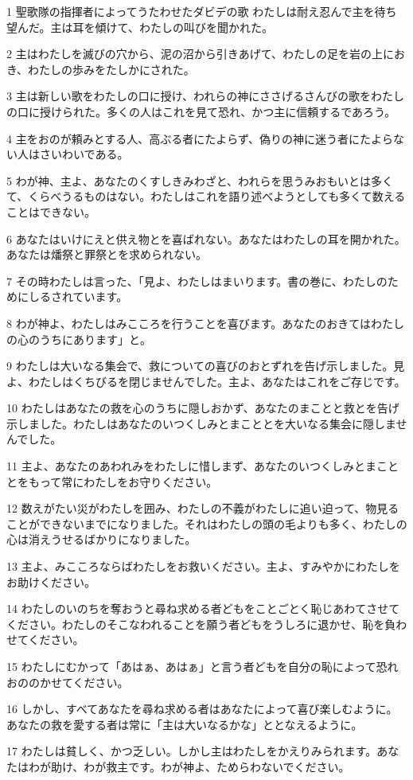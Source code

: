 \par 1 聖歌隊の指揮者によってうたわせたダビデの歌 わたしは耐え忍んで主を待ち望んだ。主は耳を傾けて、わたしの叫びを聞かれた。
\par 2 主はわたしを滅びの穴から、泥の沼から引きあげて、わたしの足を岩の上におき、わたしの歩みをたしかにされた。
\par 3 主は新しい歌をわたしの口に授け、われらの神にささげるさんびの歌をわたしの口に授けられた。多くの人はこれを見て恐れ、かつ主に信頼するであろう。
\par 4 主をおのが頼みとする人、高ぶる者にたよらず、偽りの神に迷う者にたよらない人はさいわいである。
\par 5 わが神、主よ、あなたのくすしきみわざと、われらを思うみおもいとは多くて、くらべうるものはない。わたしはこれを語り述べようとしても多くて数えることはできない。
\par 6 あなたはいけにえと供え物とを喜ばれない。あなたはわたしの耳を開かれた。あなたは燔祭と罪祭とを求められない。
\par 7 その時わたしは言った、「見よ、わたしはまいります。書の巻に、わたしのためにしるされています。
\par 8 わが神よ、わたしはみこころを行うことを喜びます。あなたのおきてはわたしの心のうちにあります」と。
\par 9 わたしは大いなる集会で、救についての喜びのおとずれを告げ示しました。見よ、わたしはくちびるを閉じませんでした。主よ、あなたはこれをご存じです。
\par 10 わたしはあなたの救を心のうちに隠しおかず、あなたのまことと救とを告げ示しました。わたしはあなたのいつくしみとまこととを大いなる集会に隠しませんでした。
\par 11 主よ、あなたのあわれみをわたしに惜しまず、あなたのいつくしみとまこととをもって常にわたしをお守りください。
\par 12 数えがたい災がわたしを囲み、わたしの不義がわたしに追い迫って、物見ることができないまでになりました。それはわたしの頭の毛よりも多く、わたしの心は消えうせるばかりになりました。
\par 13 主よ、みこころならばわたしをお救いください。主よ、すみやかにわたしをお助けください。
\par 14 わたしのいのちを奪おうと尋ね求める者どもをことごとく恥じあわてさせてください。わたしのそこなわれることを願う者どもをうしろに退かせ、恥を負わせてください。
\par 15 わたしにむかって「あはぁ、あはぁ」と言う者どもを自分の恥によって恐れおののかせてください。
\par 16 しかし、すべてあなたを尋ね求める者はあなたによって喜び楽しむように。あなたの救を愛する者は常に「主は大いなるかな」ととなえるように。
\par 17 わたしは貧しく、かつ乏しい。しかし主はわたしをかえりみられます。あなたはわが助け、わが救主です。わが神よ、ためらわないでください。

